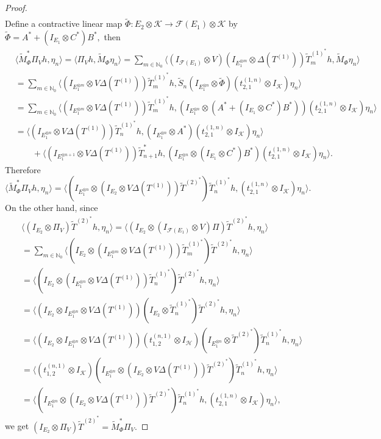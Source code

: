 \documentclass[12pt]{amsart}
\numberwithin{equation}{section}
\theoremstyle{plain}
\newcommand{\ot}{\otimes}
\newcommand{\wt}{\widetilde}
\newcommand{\wT}{\wt{T}}
\begin{document}
\begin{proof}
\begin{align*}
\end{align*} Define a contractive linear map $\widetilde{\Phi}:E_2\ot \mathcal{K}\to \mathcal{F}(E_1)\ot \mathcal{K}$ by $\widetilde{\Phi}=A^*+(I_{E_1}\ot C^*)B^*,$ then  \begin{align*}
&\langle \widetilde{M}_{\Phi}^*\Pi_V h,\eta_n \rangle =\langle \Pi_V h,\widetilde{M}_{\Phi}\eta_n \rangle=\sum_{m \in \mathbb{N}_{0}}\langle (I_{\mathcal{F}(E_1)}\ot V)(I_{E_1^{\otimes m}}\otimes\Delta(T^{(1)}))\widetilde{T}_m^{(1)^*} h,\widetilde{M}_{\Phi}\eta_n\rangle\\&=\sum_{m \in \mathbb{N}_{0}}\langle (I_{E_1^{\otimes m}}\otimes V\Delta(T^{(1)}))\widetilde{T}_m^{(1)^*} h,\widetilde{S}_n(I_{E_1^{\otimes n}} \otimes \widetilde{\Phi})(t_{2,1}^{(1,n)} \otimes I_{\mathcal{K}})\eta_n\rangle\\&=\sum_{m \in \mathbb{N}_{0}}\langle (I_{E_1^{\otimes m}}\otimes V \Delta(T^{(1)}))\widetilde{T}_m^{(1)^*} h,(I_{E_1^{\otimes n}}\otimes (A^*+(I_{E_1}\ot C^*)B^*))(t_{2,1}^{(1,n)} \otimes I_{\mathcal{K}})\eta_n\rangle  \\&= \langle (I_{E_1^{\otimes n}}\otimes V \Delta(T^{(1)}))\widetilde{T}_n^{(1)^*} h,(I_{E_1^{\otimes n}}\otimes A^*)(t_{2,1}^{(1,n)} \otimes I_{\mathcal{K}})\eta_n\rangle \\&\quad\quad  + \langle (I_{E_1^{\otimes n+1}}\otimes V \Delta(T^{(1)}))\widetilde{T}_{n+1}^* h,(I_{E_1^{\otimes n}}\otimes (I_{E_1}\ot C^*)B^*)(t_{2,1}^{(1,n)} \otimes I_{\mathcal{K}})\eta_n\rangle.
\end{align*} Therefore $\langle \widetilde{M}_{\Phi}^*\Pi_V h,\eta_n \rangle=\langle (I_{E_1^{\ot n}}\ot (I_{E_2} \ot V\Delta(T^{(1)}))\wT^{(2)^*})\wT_n^{(1)^*}h,(t_{2,1}^{(1,n)}\ot I_{\mathcal{K}})\eta_n \rangle.$ On the other hand, since \begin{align*}
&\langle (I_{E_2}\ot \Pi_V)\wT^{(2)^*}h,\eta_n  \rangle=\langle (I_{E_2}\ot (I_{\mathcal{F}(E_1)}\ot V)\Pi)\wT^{(2)^*}h,\eta_n  \rangle\\&=\sum_{m \in \mathbb{N}_{0}}\langle (I_{E_2}\ot (I_{E_1^{\ot m}}\ot V\Delta(T^{(1)}))\wT_m^{(1)^*})\wT^{(2)^*}h,\eta_n  \rangle \\&=\langle (I_{E_2}\ot (I_{E_1^{\ot n}}\ot V\Delta(T^{(1)}))\wT_n^{(1)^*})\wT^{(2)^*}h,\eta_n  \rangle \\&=\langle (I_{E_2}\ot I_{E_1^{\ot n}}\ot V\Delta(T^{(1)}))(I_{E_2}\ot \wT_n^{(1)^*})\wT^{(2)^*}h,\eta_n  \rangle \\&=\langle (I_{E_2}\ot I_{E_1^{\ot n}}\ot V\Delta(T^{(1)}))(t_{1,2}^{(n,1)}\ot I_{\mathcal{H}})(I_{E_1^{\ot n}}\ot \wT^{(2)^*})\wT_n^{(1)^*}h,\eta_n  \rangle \\&=\langle (t_{1,2}^{(n,1)}\ot I_{\mathcal{K}})(I_{E_1^{\ot n}}\ot (I_{E_2}\ot  V\Delta(T^{(1)}))\wT^{(2)^*})\wT_n^{(1)^*}h,\eta_n  \rangle \\&=\langle (I_{E_1^{\ot n}}\ot (I_{E_2}\ot  V\Delta(T^{(1)}))\wT^{(2)^*})\wT_n^{(1)^*}h,(t_{2,1}^{(1,n)}\ot I_{\mathcal{K}})\eta_n  \rangle ,
\end{align*}we get $(I_{E_2}\ot \Pi_V)\wT^{(2)^*}=\widetilde{M}_{\Phi}^*\Pi_V.$ 
\end{proof}
\end{document}
